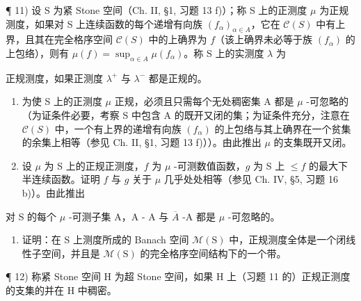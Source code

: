 ¶ 11) 设 S 为紧 Stone 空间（Ch. II, §1, 习题 13 f)）；称 S 上的正测度 \(\mu\) 为正规测度，如果对 S 上连续函数的每个递增有向族 \((f_{\alpha})_{\alpha \in A}\)，它在 \(\mathcal{C}(S)\) 中有上界，且其在完全格序空间 \(\mathcal{C}(S)\) 中的上确界为 \(f\)（该上确界未必等于族 \((f_{\alpha})\) 的上包络），则有 \(\mu(f) = \sup_{\alpha \in A} \mu(f_{\alpha})\)。称 S 上的实测度 \(\lambda\) 为

正规测度，如果正测度 \(\lambda^{+}\) 与 \(\lambda^{-}\) 都是正规的。

\begin{enumerate}
\def\labelenumi{\alph{enumi})}
\item
  为使 S 上的正测度 \(\mu\) 正规，必须且只需每个无处稠密集 A 都是 \(\mu\) -可忽略的（为证条件必要，考察 S 中包含 A 的既开又闭的集；为证条件充分，注意在 \(\mathcal{C}(S)\) 中，一个有上界的递增有向族 \((f_{\alpha})\) 的上包络与其上确界在一个贫集的余集上相等（参见 Ch. II, §1, 习题 13 f)））。由此推出 \(\mu\) 的支集既开又闭。
\item
  设 \(\mu\) 为 S 上的正规正测度，\(f\) 为 \(\mu\) -可测数值函数，\(g\) 为 S 上 \(\leqslant f\) 的最大下半连续函数。证明 \(f\) 与 \(g\) 关于 \(\mu\) 几乎处处相等（参见 Ch. IV, §5, 习题 16 b)）。由此推出
\end{enumerate}

对 S 的每个 \(\mu\) -可测子集 A，A - A 与 \(\overline{A}\) -A 都是 \(\mu\) -可忽略的。

\begin{enumerate}
\def\labelenumi{\alph{enumi})}
\setcounter{enumi}{2}
\tightlist
\item
  证明：在 S 上测度所成的 Banach 空间 \(\mathcal{M}(\mathrm{S})\) 中，正规测度全体是一个闭线性子空间，并且是 \(\mathcal{M}(\mathrm{S})\) 的完全格序空间结构下的一个带。
\end{enumerate}

¶ 12) 称紧 Stone 空间 H 为超 Stone 空间，如果 H 上（习题 11 的）正规正测度的支集的并在 H 中稠密。

